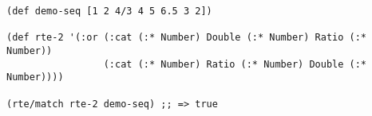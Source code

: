 \begin{lstlisting}[style=reclojureClojure,frame=single]
(def demo-seq [1 2 4/3 4 5 6.5 3 2])

(def rte-2 '(:or (:cat (:* Number) Double (:* Number) Ratio (:* Number))
                 (:cat (:* Number) Ratio (:* Number) Double (:* Number))))

(rte/match rte-2 demo-seq) ;; => true
\end{lstlisting}
